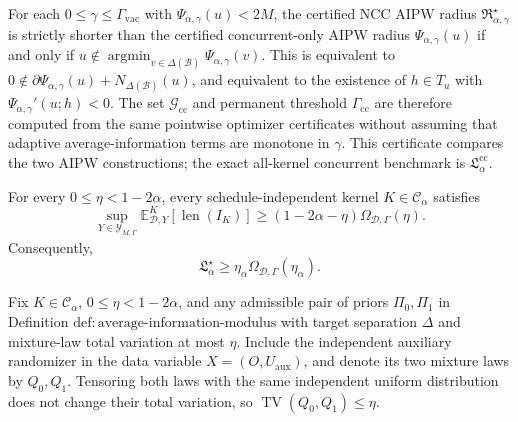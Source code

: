 For each \(0\le\gamma\le\Gamma_{\mathrm{vac}}\) with \(\Psi_{\alpha,\gamma}(u)<2M\), the certified NCC AIPW radius \(\mathfrak R_{\alpha,\gamma}^\star\) is strictly shorter than the certified concurrent-only AIPW radius \(\Psi_{\alpha,\gamma}(u)\) if and only if \(u\notin\operatorname*{argmin}_{v\in\Delta(\mathcal B)}\Psi_{\alpha,\gamma}(v)\).  This is equivalent to \(0\notin\partial\Psi_{\alpha,\gamma}(u)+N_{\Delta(\mathcal B)}(u)\), and equivalent to the existence of \(h\in T_u\) with \(\Psi_{\alpha,\gamma}'(u;h)<0\).  The set \(\mathcal G_{\mathrm{cc}}\) and permanent threshold \(\Gamma_{\mathrm{cc}}\) are therefore computed from the same pointwise optimizer certificates without assuming that adaptive average-information terms are monotone in \(\gamma\).  This certificate compares the two AIPW constructions; the exact all-kernel concurrent benchmark is \(\mathfrak L_\alpha^{\mathrm{cc}}\).

For every \(0\le\eta<1-2\alpha\), every schedule-independent kernel \(K\in\mathcal C_\alpha\) satisfies
\[
\sup_{Y\in\mathcal Y_{M,\Gamma}}
\mathbb E^K_{\mathcal D,Y}[\operatorname{len}(I_K)]
\ge (1-2\alpha-\eta)\Omega_{\mathcal D,\Gamma}(\eta).
\]
Consequently,
\[
\mathfrak L_\alpha^\star
\ge \eta_\alpha\Omega_{\mathcal D,\Gamma}(\eta_\alpha).
\]

Fix \(K\in\mathcal C_\alpha\), \(0\le\eta<1-2\alpha\), and any admissible pair of priors \(\Pi_0,\Pi_1\) in Definition \(\mathrm{def:average\text{-}information\text{-}modulus}\) with target separation \(\Delta\) and mixture-law total variation at most \(\eta\).  Include the independent auxiliary randomizer in the data variable \(X=(O,U_{\mathrm{aux}})\), and denote its two mixture laws by \(Q_0,Q_1\).  Tensoring both laws with the same independent uniform distribution does not change their total variation, so \(\operatorname{TV}(Q_0,Q_1)\le\eta\).

